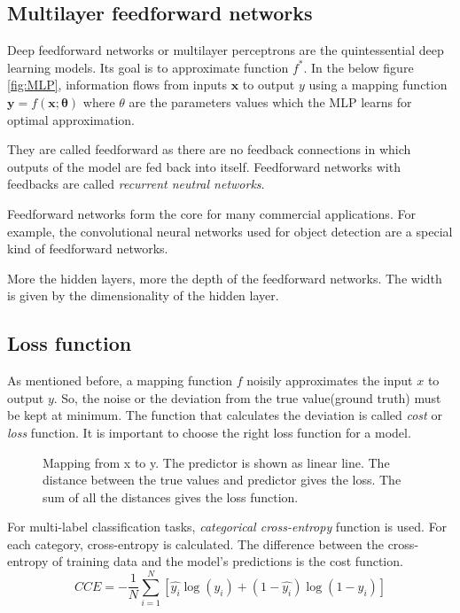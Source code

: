 \subsection{Multilayer feedforward networks}
\label{subsec:MLP}
Deep feedforward networks or multilayer perceptrons are the quintessential deep learning
models. Its goal is to approximate function $f^*$. In the below figure \ref{fig:MLP},
information flows from inputs $\mathbf{x}$ to output $y$ using a mapping function
$\mathbf{y} = f(\mathbf{x};\mathbf{\theta})$ where $\theta$ are the parameters values
which the MLP learns for optimal approximation.

They are called feedforward as there are no feedback connections in which outputs of the
model are fed back into itself. Feedforward networks with feedbacks are called
\textit{recurrent neutral networks}.

Feedforward networks form the core for many commercial applications. For example, the
convolutional neural networks used for object detection are a special kind of feedforward
networks.

More the hidden layers, more the depth of the feedforward networks. The width is given by
the dimensionality of the hidden layer.

\subsection{Loss function}
\label{subsec:lossfunction}
As mentioned before, a mapping function $f$ noisily approximates the input $x$ to output
$y$. So, the noise or the deviation from the true value(ground truth) must be kept at
minimum. The function that calculates the deviation is called \textit{cost} or
\textit{loss} function. It is important to choose the right loss function for a model.

\begin{figure}[!h]
	\centering
    \def\svgwidth{0.6\textwidth}
    \caption{Mapping from x to y. The predictor is shown as linear line. The distance
    between the true values and predictor gives the loss. The sum of all the distances
gives the loss function.}
\label{fig:loss function}
\end{figure}

For multi-label classification tasks, \textit{categorical cross-entropy} function is used.
For each category, cross-entropy is calculated. The difference between the cross-entropy
of training data and the model's predictions is the cost function.
\begin{equation}
  CCE = -\frac{1}{N}\sum_{i = 1}^N [\hat{y_{i}}\log(y_{i})  + (1-
  \hat{y_{i}})\log(1-y_{i})]
   \label{eq:CCE}
\end{equation}

